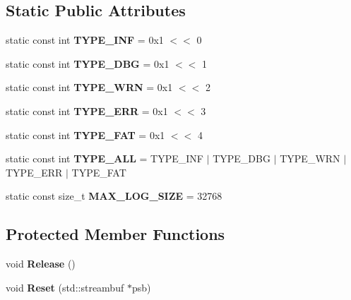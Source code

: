 \subsection*{Static Public Attributes}
\begin{DoxyCompactItemize}
\item 
\hypertarget{classlsf_1_1util_1_1Log_a6dfea291c2f53d2129b94aa3b290cd3f}{
static const int {\bfseries TYPE\_\-INF} = 0x1 $<$$<$ 0}
\label{classlsf_1_1util_1_1Log_a6dfea291c2f53d2129b94aa3b290cd3f}

\item 
\hypertarget{classlsf_1_1util_1_1Log_a63bc050a8f0e5eb2851d5872863b073d}{
static const int {\bfseries TYPE\_\-DBG} = 0x1 $<$$<$ 1}
\label{classlsf_1_1util_1_1Log_a63bc050a8f0e5eb2851d5872863b073d}

\item 
\hypertarget{classlsf_1_1util_1_1Log_a5143d508eae2f3161472a8f0e5537ce8}{
static const int {\bfseries TYPE\_\-WRN} = 0x1 $<$$<$ 2}
\label{classlsf_1_1util_1_1Log_a5143d508eae2f3161472a8f0e5537ce8}

\item 
\hypertarget{classlsf_1_1util_1_1Log_a0e0ca10cb16c2458f970260fee9a63df}{
static const int {\bfseries TYPE\_\-ERR} = 0x1 $<$$<$ 3}
\label{classlsf_1_1util_1_1Log_a0e0ca10cb16c2458f970260fee9a63df}

\item 
\hypertarget{classlsf_1_1util_1_1Log_ab6953200e09f72ddf3b201637cf3ec8e}{
static const int {\bfseries TYPE\_\-FAT} = 0x1 $<$$<$ 4}
\label{classlsf_1_1util_1_1Log_ab6953200e09f72ddf3b201637cf3ec8e}

\item 
\hypertarget{classlsf_1_1util_1_1Log_a20e76a2c3bada2eea799a13a5e853e54}{
static const int {\bfseries TYPE\_\-ALL} = TYPE\_\-INF $|$ TYPE\_\-DBG $|$ TYPE\_\-WRN $|$ TYPE\_\-ERR $|$ TYPE\_\-FAT}
\label{classlsf_1_1util_1_1Log_a20e76a2c3bada2eea799a13a5e853e54}

\item 
\hypertarget{classlsf_1_1util_1_1Log_aec75120465d469f14f3ef017eec89459}{
static const size\_\-t {\bfseries MAX\_\-LOG\_\-SIZE} = 32768}
\label{classlsf_1_1util_1_1Log_aec75120465d469f14f3ef017eec89459}

\end{DoxyCompactItemize}
\subsection*{Protected Member Functions}
\begin{DoxyCompactItemize}
\item 
\hypertarget{classlsf_1_1util_1_1Log_ac839e7dd55367745fd10376b93b99981}{
void {\bfseries Release} ()}
\label{classlsf_1_1util_1_1Log_ac839e7dd55367745fd10376b93b99981}

\item 
\hypertarget{classlsf_1_1util_1_1Log_aba6627328c2e61525c3bc34da55dc0fe}{
void {\bfseries Reset} (std::streambuf $\ast$psb)}
\label{classlsf_1_1util_1_1Log_aba6627328c2e61525c3bc34da55dc0fe}

\end{DoxyCompactItemize}
